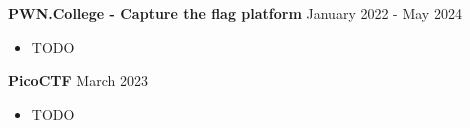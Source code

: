\textbf{PWN.College - Capture the flag platform} \hfill January 2022 - May 2024
\begin{itemize}
    \item TODO
\end{itemize}
\textbf{PicoCTF} \hfill March 2023
\begin{itemize}
    \item TODO
\end{itemize}
